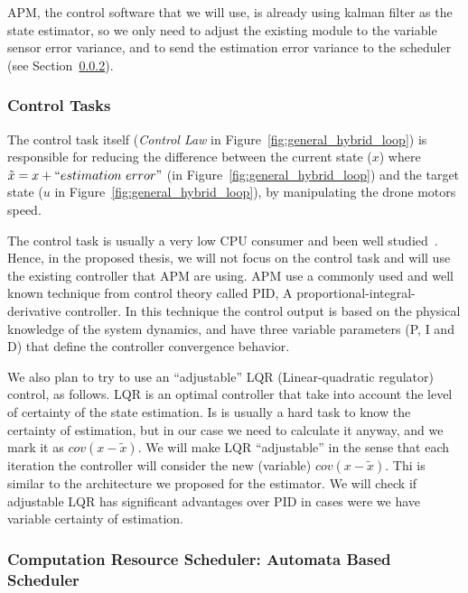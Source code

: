 \documentclass[11pt]{article}
\begin{document}
APM, the control software that we will use, is already using kalman filter as the state estimator, so we only need to adjust the existing module to the variable sensor error variance, and to send the estimation error variance to the scheduler (see Section~\ref{sec:scheduler}).

\subsubsection{Control Tasks} 
\label{sec:control}
The control task itself (\textit{Control Law} in Figure~\ref{fig:general_hybrid_loop}) is responsible for reducing the difference between the current state ($x$) where $\tilde{x} = x+ ``estimation~error"$ (in Figure~\ref{fig:general_hybrid_loop}) and the target state ($u$ in Figure~\ref{fig:general_hybrid_loop}), by manipulating the drone motors speed.

The control task is usually a very low CPU consumer and been well studied~\cite{Bennett,Cervin}. Hence, in the proposed thesis, we will not focus on the control task and will use the existing controller that APM are using.
APM use a commonly used and well known technique from control theory called PID, A proportional-integral-derivative controller.
In this technique the control output is based on the physical knowledge of the system dynamics, and have three variable parameters (P, I and D) that define the controller convergence behavior.

We also plan to try to use an ``adjustable'' LQR (Linear-quadratic regulator) control, as follows.
LQR is an optimal controller that take into account the level of certainty of the state estimation. 
Is is usually a hard task to know the certainty of estimation, but in our case we need to calculate it anyway, and we mark it as $cov(x-\tilde{x})$.
We will make LQR ``adjustable'' in the sense that each iteration the controller will consider the new (variable) $cov(x-\tilde{x})$. Thi is similar to the architecture we proposed for the estimator.
We will check if adjustable LQR has significant advantages over PID in cases were we have variable certainty of estimation.

\subsubsection{Computation Resource Scheduler: Automata Based Scheduler}
\label{sec:scheduler}
\end{document}
